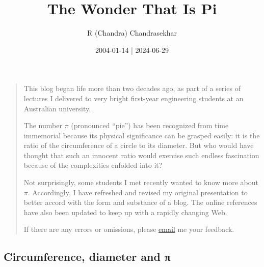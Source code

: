 \documentclass[
  a4paper,
]{article}
\title{The Wonder That Is Pi}
\author{R (Chandra) Chandrasekhar}
\date{2004-01-14 | 2024-06-29}
\begin{document}
\maketitle

\thispagestyle{empty}


\begin{quote}
This blog began life more than two decades ago, as part of a series of
lectures I delivered to very bright first-year engineering students at
an Australian university.

The number \(\pi\) (pronounced ``pie'') has been recognized from time
immemorial because its physical significance can be grasped easily: it
is the ratio of the circumference of a circle to its diameter. But who
would have thought that such an innocent ratio would exercise such
endless fascination because of the complexities enfolded into it?

Not surprisingly, some students I met recently wanted to know more about
\(\pi\). Accordingly, I have refreshed and revised my original
presentation to better accord with the form and substance of a blog. The
online references have also been updated to keep up with a rapidly
changing Web.

If there are any errors or omissions, please
\href{mailto:feedback.swanlotus@gmail.com}{email} me your feedback.
\end{quote}

\subsection{Circumference, diameter and
π}\label{circumference-diameter-and-ux3c0}
\end{document}
